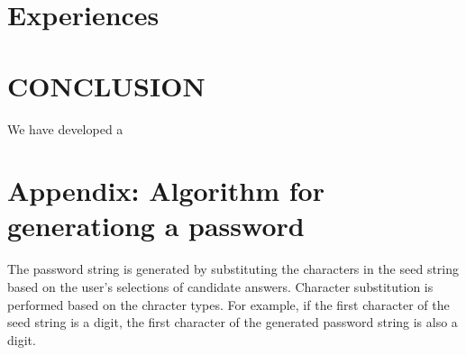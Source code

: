 \documentclass{article}
\begin{document}
\section{Experiences}


\section{CONCLUSION}

We have developed a 

%
%

{%


}

\section*{Appendix: Algorithm for generationg a password}



The password string is generated by
substituting the characters in the seed string
based on the user's selections of candidate answers.
Character substitution is performed based on the chracter types.
For example, if the first character of the seed string is a digit,
the first character of the generated password string is also a digit.

\end{document}

